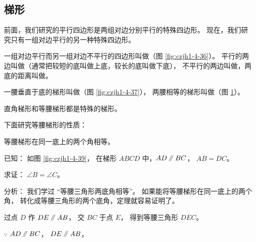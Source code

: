 \subsection{梯形}\label{subsec:czjh1-4-9}

前面，我们研究的平行四边形是两组对边分别平行的特殊四边形。
现在，我们研究只有一组对边平行的另一种特殊四边形。

一组对边平行而另一组对边不平行的四边形叫做（图 \ref{fig:czjh1-4-36}）。
平行的两边叫做（通常把较短的底叫做上底，较长的底叫做下底），
不平行的两边叫做，两底的距离叫做。

\begin{figure}[htbp]
    \centering
    \begin{minipage}[b]{4.5cm}
        \centering
        
        \caption{}\label{fig:czjh1-4-36}
    \end{minipage}
    \qquad
    \begin{minipage}[b]{4.5cm}
        \centering
        
        \caption{}\label{fig:czjh1-4-37}
    \end{minipage}
    \qquad
    \begin{minipage}[b]{4.5cm}
        \centering
        
        \caption{}\label{fig:czjh1-4-38}
    \end{minipage}
\end{figure}

一腰垂直于底的梯形叫做（图 \ref{fig:czjh1-4-37}），
两腰相等的梯形叫做（图 \ref{fig:czjh1-4-38}）。

直角梯形和等腰梯形都是特殊的梯形。

下面研究等腰梯形的性质：

\begin{dingli}[等腰梯形性质定理]
    等腰梯形在同一底上的两个角相等。
\end{dingli}

已知： 如图 \ref{fig:czjh1-4-39}， 在梯形 $ABCD$ 中，$AD \pingxing BC$， $AB = DC$。

求证： $\angle B = \angle C$。

分析： 我们学过 “等腰三角形两底角相等”。 如果能将等腰梯形在同一底上的两个角，
转化成等腰三角形的两个底角，定理就容易证明了。

\zhengming 过点 $D$ 作 $DE \pingxing AB$， 交 $BC$ 于点 $E$， 得到等腰三角形 $DEC$。

$\because$ \quad $AD \pingxing BC$， $DE \pingxing AB$，

